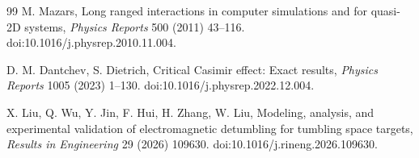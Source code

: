 \documentclass[preprint,12pt]{elsarticle}
\begin{document}
\begin{thebibliography}{99}
M. Mazars, Long ranged interactions in computer simulations and for quasi-2D systems, \textit{Physics Reports} 500 (2011) 43--116. doi:10.1016/j.physrep.2010.11.004.

D. M. Dantchev, S. Dietrich, Critical Casimir effect: Exact results, \textit{Physics Reports} 1005 (2023) 1--130. doi:10.1016/j.physrep.2022.12.004.

X. Liu, Q. Wu, Y. Jin, F. Hui, H. Zhang, W. Liu, Modeling, analysis, and experimental validation of electromagnetic detumbling for tumbling space targets, \textit{Results in Engineering} 29 (2026) 109630. doi:10.1016/j.rineng.2026.109630.

\end{thebibliography}
\end{document}
